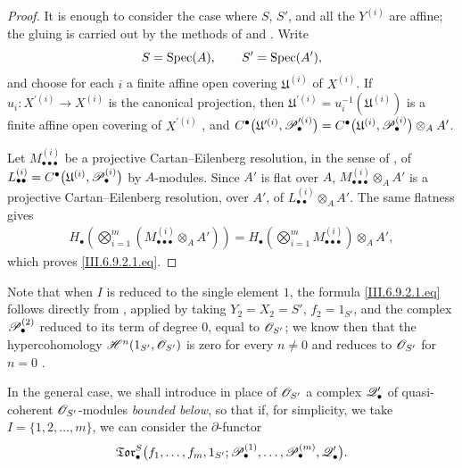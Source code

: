 \begin{proof}
It is enough to consider the case where $S$, $S'$, and all the
$Y^{(i)}$ are affine; the gluing is carried out by the methods of
 and .  Write
\[
  S=\operatorname{Spec}(A),
  \qquad
  S'=\operatorname{Spec}(A'),
\]
and choose for each $i$ a finite affine open covering
$\mathfrak U^{(i)}$ of $X^{(i)}$.  If
$u_i:X^{\prime(i)}\to X^{(i)}$ is the canonical projection, then $\mathfrak U^{\prime(i)}
=
u_i^{-1}(\mathfrak U^{(i)})$
is a finite affine open covering of $X^{\prime(i)}$
, and $C^\bullet
\bigl(
\mathfrak U^{\prime(i)},\mathscr{P}_\bullet^{\prime(i)}
\bigr)
=
C^\bullet
\bigl(
\mathfrak U^{(i)},\mathscr{P}_\bullet^{(i)}
\bigr)
\otimes_AA'$.

Let $M_{\bullet\bullet\bullet}^{(i)}$ be a projective
Cartan--Eilenberg resolution, in the sense of
, of $L_{\bullet\bullet}^{(i)}
=
C^\bullet
\bigl(
\mathfrak U^{(i)},\mathscr{P}_\bullet^{(i)}
\bigr)$
by $A$-modules.  Since $A'$ is flat over $A$, $M_{\bullet\bullet\bullet}^{(i)}\otimes_AA'$
is a projective Cartan--Eilenberg resolution, over $A'$, of
$L_{\bullet\bullet}^{(i)}\otimes_AA'$.  The same flatness gives
\[
\begin{split}
  H_\bullet
  \left(
    \bigotimes_{i=1}^{m}
    (M_{\bullet\bullet\bullet}^{(i)}\otimes_AA')
  \right)
  =
  H_\bullet
  \left(
    \bigotimes_{i=1}^{m}
    M_{\bullet\bullet\bullet}^{(i)}
  \right)
  \otimes_AA',
\end{split}
\]
which proves \eqref{III.6.9.2.1.eq}.
\end{proof}

%
Note that when $I$ is reduced to the single element $1$, the formula
\eqref{III.6.9.2.1.eq} follows directly from
, applied by taking $Y_2=X_2=S'$, $f_2=1_{S'}$, and the
complex $\mathscr{P}_\bullet^{(2)}$ reduced to its term of degree $0$, equal to
$\mathscr{O}_{S'}$; we know then that the hypercohomology $\mathscr{H}^n(1_{S'},\mathscr{O}_{S'})$
is zero for every $n\neq0$ and reduces to $\mathscr{O}_{S'}$ for $n=0$
.

In the general case, we shall introduce in place of $\mathscr{O}_{S'}$ a
complex $\mathscr{Q}_\bullet'$ of quasi-coherent
$\mathscr{O}_{S'}$-modules \emph{bounded below}, so that if, for simplicity, we
take $I=\{1,2,\ldots,m\}$, we can consider the
$\partial$-functor
\[
  \mathfrak{Tor}_\bullet^S
  \bigl(
    f_1,\ldots,f_m,1_{S'};
    \mathscr{P}_\bullet^{(1)},\ldots,\mathscr{P}_\bullet^{(m)},
    \mathscr{Q}_\bullet'
  \bigr).
\]

